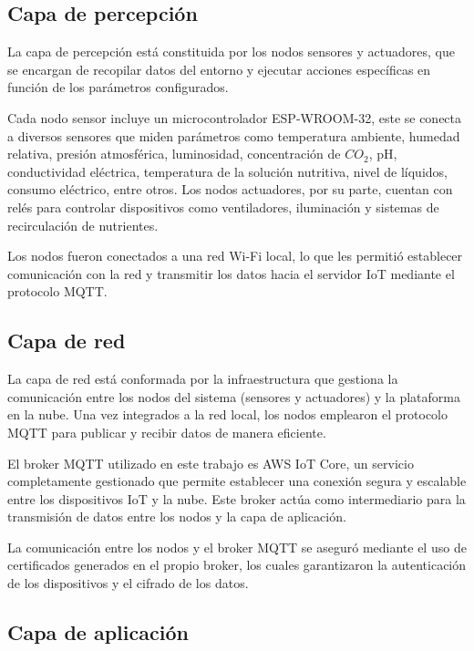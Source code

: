 \subsection{Capa de percepción}

La capa de percepción está constituida por los nodos sensores y actuadores, que
se encargan de recopilar datos del entorno y ejecutar acciones específicas en
función de los parámetros configurados.

Cada nodo sensor incluye un microcontrolador ESP-WROOM-32, este se conecta a
diversos sensores que miden parámetros como temperatura ambiente, humedad
relativa, presión atmosférica, luminosidad, concentración de $CO_2$, pH,
conductividad eléctrica, temperatura de la solución nutritiva, nivel de
líquidos, consumo eléctrico, entre otros. Los nodos actuadores, por su parte,
cuentan con relés para controlar dispositivos como ventiladores, iluminación y
sistemas de recirculación de nutrientes.

Los nodos fueron conectados a una red Wi-Fi local, lo que les permitió
establecer comunicación con la red y transmitir los datos hacia el servidor IoT
mediante el protocolo MQTT.

\subsection{Capa de red}

La capa de red está conformada por la infraestructura que gestiona la
comunicación entre los nodos del sistema (sensores y actuadores) y la
plataforma en la nube. Una vez integrados a la red local, los nodos emplearon
el protocolo MQTT para publicar y recibir datos de manera eficiente.

El broker MQTT utilizado en este trabajo es AWS IoT Core, un servicio
completamente gestionado que permite establecer una conexión segura y escalable
entre los dispositivos IoT y la nube. Este broker actúa como intermediario para
la transmisión de datos entre los nodos y la capa de aplicación.

La comunicación entre los nodos y el broker MQTT se aseguró mediante el uso de
certificados generados en el propio broker, los cuales garantizaron la
autenticación de los dispositivos y el cifrado de los datos.

\subsection{Capa de aplicación}

